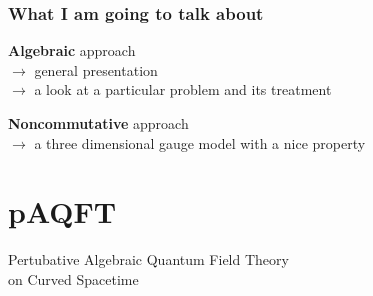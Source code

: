 \documentclass[9pt]{beamer}
\begin{document}

\begin{frame}

\frametitle{What I am going to talk about}
  
\vfill
   
\textbf{Algebraic} approach \\
$\to$ general presentation \\
$\to$ a look at a particular problem and its treatment

\vfill
   
\textbf{Noncommutative} approach \\
$\to$ a three dimensional gauge model with a nice property

\vfill

\end{frame}

\section{pAQFT}

{%
%
% 
%
%
%
%
\begin{frame}%
\bf
\vspace*{30pt}
%
\begin{exampleblock}{\vspace*{-3ex}}%
%
\begin{center}%
%
\Large Pertubative Algebraic Quantum Field Theory \\[10pt] on Curved Spacetime
%
\end{center}%
%
\end{exampleblock}%
%
\end{frame}
%
}%
\end{document}
